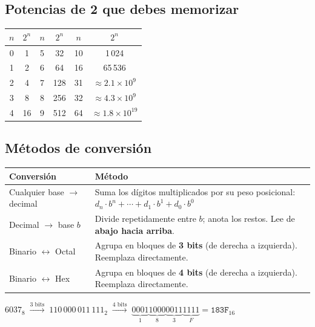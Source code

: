 \documentclass[12pt, oneside]{article}
\begin{document}
\subsection{Potencias de 2 que debes memorizar}

\begin{center}
\begin{tabular}{cc|cc|cc}
  \toprule
  $n$ & $2^n$ & $n$ & $2^n$ & $n$ & $2^n$ \\
  \midrule
  0 & 1     & 5  & 32     & 10 & 1\,024  \\
  1 & 2     & 6  & 64     & 16 & 65\,536 \\
  2 & 4     & 7  & 128    & 31 & $\approx 2.1 \times 10^9$ \\
  3 & 8     & 8  & 256    & 32 & $\approx 4.3 \times 10^9$ \\
  4 & 16    & 9  & 512    & 64 & $\approx 1.8 \times 10^{19}$ \\
  \bottomrule
\end{tabular}
\end{center}

\subsection{Métodos de conversión}

\begin{center}
\begin{tabular}{lp{8cm}}
  \toprule
  \textbf{Conversión} & \textbf{Método} \\
  \midrule
  Cualquier base $\to$ decimal &
    Suma los dígitos multiplicados por su peso posicional:
    $d_n \cdot b^n + \cdots + d_1 \cdot b^1 + d_0 \cdot b^0$ \\[6pt]
  Decimal $\to$ base $b$ &
    Divide repetidamente entre $b$; anota los restos.
    Lee de \textbf{abajo hacia arriba}. \\[6pt]
  Binario $\leftrightarrow$ Octal &
    Agrupa en bloques de \textbf{3 bits} (de derecha a izquierda).
    Reemplaza directamente. \\[6pt]
  Binario $\leftrightarrow$ Hex &
    Agrupa en bloques de \textbf{4 bits} (de derecha a izquierda).
    Reemplaza directamente. \\
  \bottomrule
\end{tabular}
\end{center}

\begin{ejemplo}
$6037_8 \;\xrightarrow{\text{3 bits}}\; 110\,000\,011\,111_2
\;\xrightarrow{\text{4 bits}}\; \underbrace{0001}_{1}\underbrace{1000}_{8}\underbrace{0011}_{3}\underbrace{1111}_{F}
= \mathtt{183F}_{16}$
\end{ejemplo}
\end{document}
